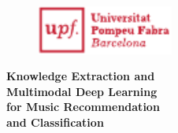 
\newpage
\thispagestyle{empty}
\begin{titlingpage}
\begin{flushright}

  \begin{figure}[t]
    \begin{flushright}
      \includegraphics[width=4.5cm]{ch00_pics/upf-logo-bo}
    \end{flushright}
  \end{figure}

  \vspace*{2.2cm} 


  {\huge \textbf{Knowledge Extraction and \\ \vspace*{0.15cm} Multimodal Deep Learning \\ \vspace*{0.10cm} for Music Recommendation \\ \vspace*{0.45cm} and Classification}}


\end{flushright}
\end{titlingpage}
